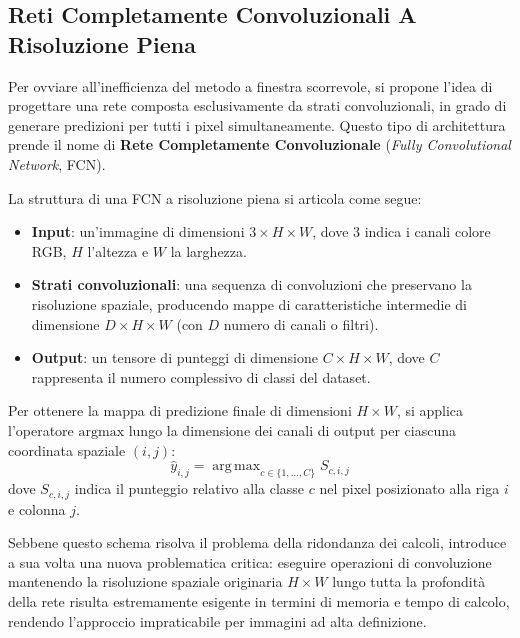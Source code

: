 ﻿\documentclass[11pt, a4paper]{article}
\DeclareMathOperator*{\argmax}{arg\,max}
\begin{document}
\subsection{Reti Completamente Convoluzionali A Risoluzione Piena}

Per ovviare all'inefficienza del metodo a finestra scorrevole, si propone l'idea di progettare una rete composta esclusivamente da strati convoluzionali, in grado di generare predizioni per tutti i pixel simultaneamente. Questo tipo di architettura prende il nome di \textbf{Rete Completamente Convoluzionale} (\emph{Fully Convolutional Network}, FCN).


La struttura di una FCN a risoluzione piena si articola come segue:
\begin{itemize}
    \item \textbf{Input}: un'immagine di dimensioni $3 \times H \times W$, dove $3$ indica i canali colore RGB, $H$ l'altezza e $W$ la larghezza.
    \item \textbf{Strati convoluzionali}: una sequenza di convoluzioni che preservano la risoluzione spaziale, producendo mappe di caratteristiche intermedie di dimensione $D \times H \times W$ (con $D$ numero di canali o filtri).
    \item \textbf{Output}: un tensore di punteggi di dimensione $C \times H \times W$, dove $C$ rappresenta il numero complessivo di classi del dataset.
\end{itemize}

Per ottenere la mappa di predizione finale di dimensioni $H \times W$, si applica l'operatore $\text{argmax}$ lungo la dimensione dei canali di output per ciascuna coordinata spaziale $(i, j)$:
\[
\boxed{\hat{y}_{i, j} = \argmax_{c \in \{1, \dots, C\}} S_{c, i, j}}
\]
dove $S_{c, i, j}$ indica il punteggio relativo alla classe $c$ nel pixel posizionato alla riga $i$ e colonna $j$.

Sebbene questo schema risolva il problema della ridondanza dei calcoli, introduce a sua volta una nuova problematica critica: eseguire operazioni di convoluzione mantenendo la risoluzione spaziale originaria $H \times W$ lungo tutta la profondità della rete risulta estremamente esigente in termini di memoria e tempo di calcolo, rendendo l'approccio impraticabile per immagini ad alta definizione.
\end{document}
